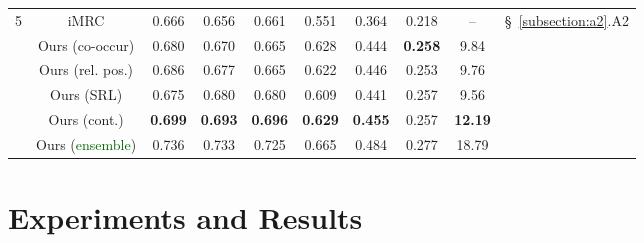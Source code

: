 \documentclass[11pt]{article}
\newcommand{\fone}{$\text{F}_1$\xspace}
\newcommand{\isquad}{iSQuAD\xspace}
\newcommand{\imrc}{iMRC\xspace}
\newcommand{\clg}{\cellcolor{lightgray}}
\newcommand{\cly}{\cellcolor{lightyellow}}
\begin{document}
\begin{table*}[t!]
\begin{tabular}{c|c|ccc|ccc|c|c}
        \hline
        \multirow{6}{*}{5} &\clg\imrc \citep{yuan2020imrc}      &  \clg0.666 & \clg0.656 & \clg0.661 & \clg0.551 & \clg0.364 & \clg0.218 & \clg-- & \multirow{6}{*}{\S~\ref{subsection:a2}.A2}\\
        &Ours (co-occur)          &  \cly0.680 & \cly0.670 & \cly0.665 & \cly0.628 & \cly0.444 & \cly\textbf{0.258} & \cly9.84 & \\
        &Ours (rel. pos.)         &  \cly0.686 & \cly0.677 & \cly0.665 & \cly0.622 & \cly0.446 & \cly0.253 & \cly9.76 & \\
        &Ours (SRL)               &  \cly0.675 & \cly0.680 & \cly0.680 & \cly0.609 & \cly0.441 & \cly0.257 & \cly9.56 & \\
        &Ours (cont.)             &  \cly\textbf{0.699} & \cly\textbf{0.693} & \cly\textbf{0.696} & \cly\textbf{0.629} & \cly\textbf{0.455} & \cly0.257 & \cly\textbf{12.19} &  \\
        & Ours (\textcolor{darkgreen}{ensemble})         &  \cly0.736 & \cly0.733 & \cly0.725 & \cly0.665 & \cly0.484 & \cly0.277 & \cly18.79 & \\
        
        \bottomrule
    \end{tabular}
    \caption{Testing \fone scores and the relative improvement \%RI (averaged over six settings in a row). Best \textbf{single agent} scores within each setting are highlighted with \textbf{boldface}, scores better than \imrc are shaded in yellow.
    }
    \label{tab:result_a1a2}
\end{table*}


\section{Experiments and Results}
\label{section:exp_and_result}

\end{document}
